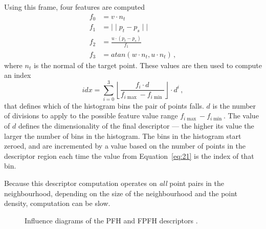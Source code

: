 \documentclass[11pt,a4paper]{kth-mag}
\begin{document}
Using this frame, four features are computed
\begin{align}
  \label{eq:20}
  f_0&=v\cdot n_t\\
  f_1&=\mid\mid p_t - p_s\mid\mid\\
  f_2&=\frac{u\cdot(p_t-p_s)}{f_1}\\
  f_3&=atan(w\cdot n_t,u\cdot n_t)\,,
\end{align}
where $n_t$ is the normal of the target point. These values are then used to
compute an index
\begin{equation}
  \label{eq:21}
  idx=\sum^3_{i=0}\left\lfloor \frac{f_i\cdot d}{f_{i\max}-f_{i\min}}\right\rfloor\cdot d^i\,,
\end{equation}
that defines which of the histogram bins the pair of points falls. $d$ is the
number of divisions to apply to the possible feature value range
$f_{i\max}-f_{i\min}$. The value of $d$ defines the dimensionality of the final
descriptor --- the higher its value the larger the number of bins in the
histogram. The bins in the histogram start zeroed, and are incremented by a
value based on the number of points in the descriptor region each time the
value from Equation~\eqref{eq:21} is the index of that bin.

Because this descriptor computation operates on \emph{all} point pairs in the
neighbourhood, depending on the size of the neighbourhood and the point density,
computation can be slow.
\begin{figure}
  \centering
  \caption{Influence diagrams of the PFH and FPFH descriptors \cite{rusu2009fast}.}
  \label{fig:pfhinfluence}
\end{figure}
\end{document}
